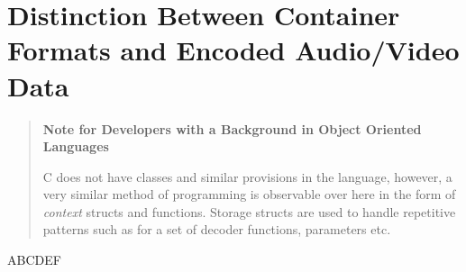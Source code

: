 \documentclass{article}
\begin{document}
\section{Distinction Between Container Formats and Encoded Audio/Video Data}
\begin{quote}
\textbf{Note for Developers with a Background in Object Oriented Languages}

C does not have classes and similar provisions in the language, however, a very 
similar method of programming is observable over here in the form of 
\emph{context} structs and functions. Storage structs are used to handle 
repetitive patterns such as for a set of decoder functions, parameters etc.


\end{quote}

\begin{thebibliography}{9}
	ABCDEF
\end{thebibliography}
\end{document}
